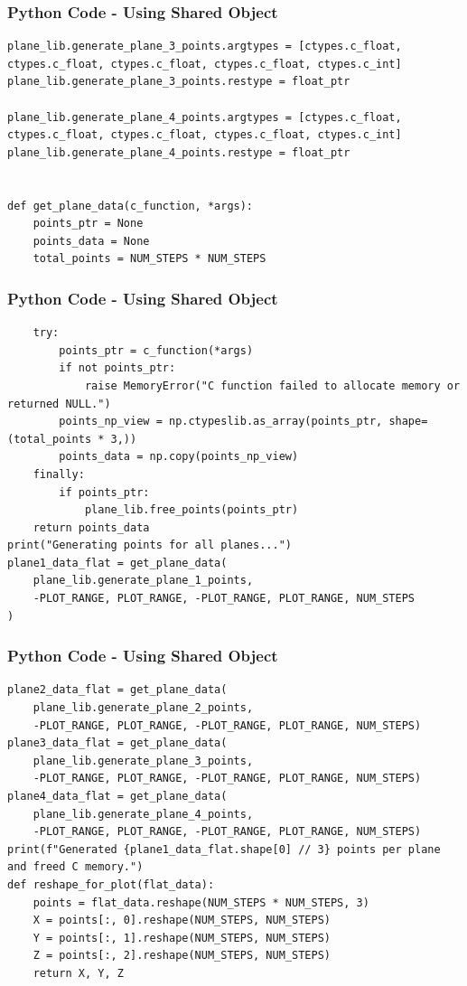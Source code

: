 \documentclass{beamer}
\begin{document}
\begin{frame}[fragile]
    \frametitle{Python Code - Using Shared Object}
    \begin{lstlisting}
plane_lib.generate_plane_3_points.argtypes = [ctypes.c_float, ctypes.c_float, ctypes.c_float, ctypes.c_float, ctypes.c_int]
plane_lib.generate_plane_3_points.restype = float_ptr

plane_lib.generate_plane_4_points.argtypes = [ctypes.c_float, ctypes.c_float, ctypes.c_float, ctypes.c_float, ctypes.c_int]
plane_lib.generate_plane_4_points.restype = float_ptr


def get_plane_data(c_function, *args):
    points_ptr = None
    points_data = None
    total_points = NUM_STEPS * NUM_STEPS
\end{lstlisting}
\end{frame}
\begin{frame}[fragile]
    \frametitle{Python Code - Using Shared Object}
    \begin{lstlisting}
    try:
        points_ptr = c_function(*args)
        if not points_ptr:
            raise MemoryError("C function failed to allocate memory or returned NULL.")
        points_np_view = np.ctypeslib.as_array(points_ptr, shape=(total_points * 3,))
        points_data = np.copy(points_np_view)
    finally:
        if points_ptr:
            plane_lib.free_points(points_ptr)
    return points_data
print("Generating points for all planes...")
plane1_data_flat = get_plane_data(
    plane_lib.generate_plane_1_points, 
    -PLOT_RANGE, PLOT_RANGE, -PLOT_RANGE, PLOT_RANGE, NUM_STEPS
)
\end{lstlisting}
\end{frame}
\begin{frame}[fragile]
    \frametitle{Python Code - Using Shared Object}
    \begin{lstlisting}
plane2_data_flat = get_plane_data(
    plane_lib.generate_plane_2_points,
    -PLOT_RANGE, PLOT_RANGE, -PLOT_RANGE, PLOT_RANGE, NUM_STEPS)
plane3_data_flat = get_plane_data(
    plane_lib.generate_plane_3_points,
    -PLOT_RANGE, PLOT_RANGE, -PLOT_RANGE, PLOT_RANGE, NUM_STEPS)
plane4_data_flat = get_plane_data(
    plane_lib.generate_plane_4_points,
    -PLOT_RANGE, PLOT_RANGE, -PLOT_RANGE, PLOT_RANGE, NUM_STEPS)
print(f"Generated {plane1_data_flat.shape[0] // 3} points per plane and freed C memory.")
def reshape_for_plot(flat_data):
    points = flat_data.reshape(NUM_STEPS * NUM_STEPS, 3)
    X = points[:, 0].reshape(NUM_STEPS, NUM_STEPS)
    Y = points[:, 1].reshape(NUM_STEPS, NUM_STEPS)
    Z = points[:, 2].reshape(NUM_STEPS, NUM_STEPS)
    return X, Y, Z

\end{lstlisting}
\end{frame}
\end{document}
